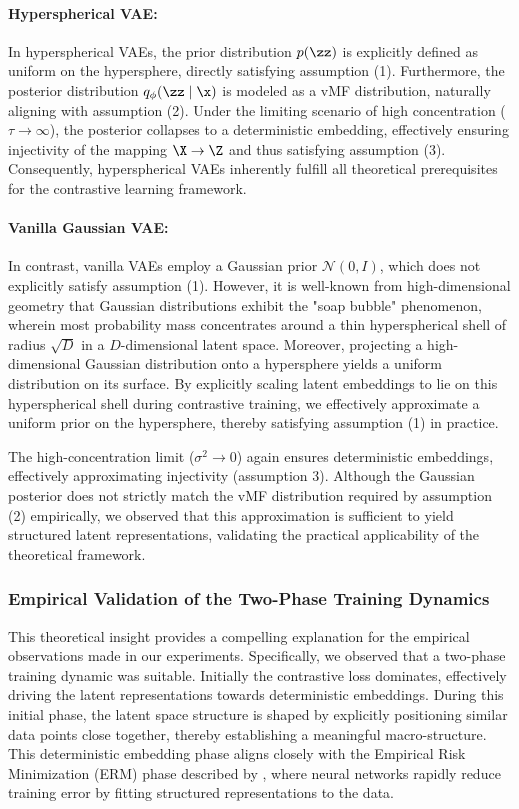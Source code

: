 \paragraph{Hyperspherical VAE:} In hyperspherical VAEs, the prior distribution $p(\zz)$ is explicitly defined as uniform on the hypersphere, directly satisfying assumption (1). Furthermore, the posterior distribution $q_{\phi}(\zz \mid \x)$ is modeled as a vMF distribution, naturally aligning with assumption (2). Under the limiting scenario of high concentration ($\tau \to \infty$), the posterior collapses to a deterministic embedding, effectively ensuring injectivity of the mapping $\X \rightarrow \Z$ and thus satisfying assumption (3). Consequently, hyperspherical VAEs inherently fulfill all theoretical prerequisites for the contrastive learning framework.

\paragraph{Vanilla Gaussian VAE:} In contrast, vanilla VAEs employ a Gaussian prior $\mathcal{N}(0, I)$, which does not explicitly satisfy assumption (1). However, it is well-known from high-dimensional geometry that Gaussian distributions exhibit the "soap bubble" phenomenon, wherein most probability mass concentrates around a thin hyperspherical shell of radius $\sqrt{D}$ in a $D$-dimensional latent space. Moreover, projecting a high-dimensional Gaussian distribution onto a hypersphere yields a uniform distribution on its surface. By explicitly scaling latent embeddings to lie on this hyperspherical shell during contrastive training, we effectively approximate a uniform prior on the hypersphere, thereby satisfying assumption (1) in practice.

The high-concentration limit ($\sigma^2 \to 0$) again ensures deterministic embeddings, effectively approximating injectivity (assumption 3). Although the Gaussian posterior does not strictly match the vMF distribution required by assumption (2) empirically, we observed that this approximation is sufficient to yield structured latent representations, validating the practical applicability of the theoretical framework.

\subsubsection{Empirical Validation of the Two-Phase Training Dynamics}

This theoretical insight provides a compelling explanation for the empirical observations made in our experiments. Specifically, we observed that a two-phase training dynamic was suitable. Initially the contrastive loss dominates, effectively driving the latent representations towards deterministic embeddings. During this initial phase, the latent space structure is shaped by explicitly positioning similar data points close together, thereby establishing a meaningful macro-structure. This deterministic embedding phase aligns closely with the Empirical Risk Minimization (ERM) phase described by \cite{shwartz2017opening}, where neural networks rapidly reduce training error by fitting structured representations to the data.

